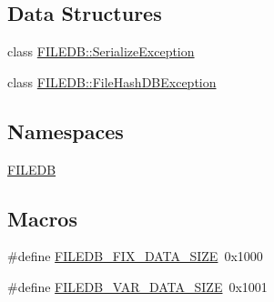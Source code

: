 \subsection*{Data Structures}
\begin{DoxyCompactItemize}
\item 
class \mbox{\hyperlink{classFILEDB_1_1SerializeException}{F\+I\+L\+E\+D\+B\+::\+Serialize\+Exception}}
\item 
class \mbox{\hyperlink{classFILEDB_1_1FileHashDBException}{F\+I\+L\+E\+D\+B\+::\+File\+Hash\+D\+B\+Exception}}
\end{DoxyCompactItemize}
\subsection*{Namespaces}
\begin{DoxyCompactItemize}
\item 
 \mbox{\hyperlink{namespaceFILEDB}{F\+I\+L\+E\+DB}}
\end{DoxyCompactItemize}
\subsection*{Macros}
\begin{DoxyCompactItemize}
\item 
\#define \mbox{\hyperlink{adat-devel_2other__libs_2filedb_2src_2FileDB_8h_a0ca73cb1caddb682667d46ffb3997fdb}{F\+I\+L\+E\+D\+B\+\_\+\+F\+I\+X\+\_\+\+D\+A\+T\+A\+\_\+\+S\+I\+ZE}}~0x1000
\item 
\#define \mbox{\hyperlink{adat-devel_2other__libs_2filedb_2src_2FileDB_8h_a7adb86dcc0fbdff7b0555a5b8b12c501}{F\+I\+L\+E\+D\+B\+\_\+\+V\+A\+R\+\_\+\+D\+A\+T\+A\+\_\+\+S\+I\+ZE}}~0x1001
\end{DoxyCompactItemize}
